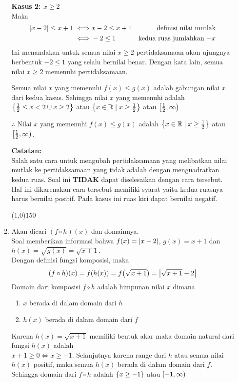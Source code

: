\begin{enumerate}[leftmargin=*, label={\arabic*}.]
\begin{enumerate}[label={\alph*}.]
\textbf{Kasus 2: $x \geq 2$}\\
Maka
\begin{align*}
    \abs{x-2} \leq x+1
    \iff &x-2 \leq x+1 
    &\text{definisi nilai mutlak} \\
    \iff &-2 \leq 1
    &\text{kedua ruas jumlahkan $-x$}
\end{align*}
Ini menandakan untuk semua nilai $x \geq 2$ pertidaksamaan akan ujungnya 
berbentuk $-2 \leq 1$ yang selalu bernilai benar. Dengan kata lain, semua 
nilai $x \geq 2$ memenuhi pertidaksamaan.
    
Semua nilai $x$ yang memenuhi $f(x) \leq g(x)$ adalah gabungan nilai $x$ 
dari kedua kasus. Sehingga nilai $x$ yang memenuhi adalah 
$\set*{\frac{1}{2} \leq x < 2 \cup x \geq 2}$ atau 
$\set*{x \in \mathbb{R} \mid x \geq \frac{1}{2}}$
atau $\cio*{\frac{1}{2}, \infty}$
    
$\therefore$ Nilai $x$ yang memenuhi $f(x) \leq g(x)$ adalah
$\set*{x \in \mathbb{R} \mid x \geq \frac{1}{2}}$ atau
$\cio*{\frac{1}{2}, \infty}$.
    
\vspace{0.1cm}
\textbf{Catatan:}\\
Salah satu cara untuk mengubah pertidaksamaan yang melibatkan nilai mutlak 
ke pertidaksamaan yang tidak adalah dengan menguadratkan kedua ruas. Soal 
ini \textbf{TIDAK} dapat diselesaikan dengan cara tersebut. Hal ini 
dikarenakan cara tersebut memiliki syarat yaitu kedua ruasnya harus bernilai 
positif. Pada kasus ini ruas kiri dapat bernilai negatif.
\begin{center}
    \line(1,0){150}
\end{center}
\item Akan dicari $(f \circ h)(x)$ dan domainnya.\\
Soal memberikan informasi bahwa $f(x) = \abs{x-2}$, $g(x) = x+1$ dan 
$h(x) = \sqrt{g(x)} = \sqrt{x+1}$.\\
Dengan definisi fungsi komposisi, maka
\[
    (f \circ h)(x) = f(h(x)) = f\brk*{\sqrt{x+1}} = \abs*{\sqrt{x+1}-2}
\]
Domain dari komposisi $f \circ h$ adalah himpunan nilai $x$ dimana
\begin{enumerate}[label={\arabic*})]
    \item $x$ berada di dalam domain dari $h$
    \item $h(x)$ berada di dalam domain dari $f$
\end{enumerate}
Karena $h(x) = \sqrt{x+1}$ memiliki bentuk akar maka domain natural dari 
fungsi $h(x)$ adalah \\ $x+1 \geq 0 \iff x \geq -1$.
Selanjutnya karena range dari $h$ atau semua nilai $h(x)$ positif, maka
semua $h(x)$ berada di dalam domain dari $f$. Sehingga domain dari 
$f \circ h$ adalah $\set*{x \geq -1}$ atau $\cio{-1,\infty}$
    

\end{enumerate}
\end{enumerate}
